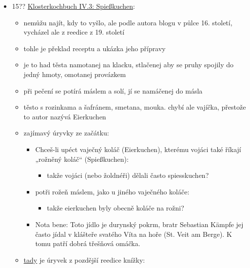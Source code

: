 \begin{itemize}
  \begin{itemize}
  \tightlist
  \item
    Staindl, Balthasar, Německo
  \item
    recept s. 72, \hyperref[250922-1759]{Ain höflich essen haisst der
    raiff}.
  \item
    je to kynutý těsto s rozinkama, plát těsta namotaný na špíz,
    potíraný žloutkem
  \item
    \href{https://www.culina-vetus.de/2025/12/07/a-variation-on-spieskuchen/}{tady}
    je další překlad a nějaký komentáře na německým blogu o kulinární
    historii
  \end{itemize}
\item
  15??
  \href{https://www.culina-vetus.de/2021/10/11/sixteenth-century-spieskuchen/}{Klosterkochbuch
  IV.3: Spießkuchen}:

  \begin{itemize}
  \tightlist
  \item
    nemůžu najít, kdy to vyšlo, ale podle autora blogu v půlce 16.
    století, vycházel ale z reedice z 19. století
  \item
    tohle je překlad receptu a ukázka jeho přípravy
  \item
    je to had těsta namotanej na klacku, stlačenej aby se pruhy spojily
    do jedný hmoty, omotanej provázkem
  \item
    při pečení se potírá máslem a solí, jí se namáčenej do másla
  \item
    těsto s rozinkama a šafránem, smetana, mouka. chybí ale vajíčka,
    přestože to autor nazývá Eierkuchen
  \item
    zajímavý úryvky ze začátku:

    \begin{itemize}
    \tightlist
    \item
      Chceš-li upéct vaječný koláč (Eierkuchen), kterému vojáci také
      říkají „rožněný koláč`` (Spießkuchen):

      \begin{itemize}
      \tightlist
      \item
        takže vojáci (nebo žoldnéři) dělali často spiesskuchen?
      \end{itemize}
    \item
      potři rožeň máslem, jako u jiného vaječného koláče:

      \begin{itemize}
      \tightlist
      \item
        takže eierkuchen byly obecně koláče na rožni?
      \end{itemize}
    \item
      Nota bene: Toto jídlo je durynský pokrm, bratr Sebastian Kämpfe
      jej často jídal v klášteře svatého Víta na hoře (St. Veit am
      Berge). K tomu patří dobrá třešňová omáčka.
    \end{itemize}
  \item
    \href{http://www.kurtos.eu/dl/klofter_kochbuch.pdf}{tady} je úryvek
    z pozdější reedice knížky:


\end{itemize}
\end{itemize}
